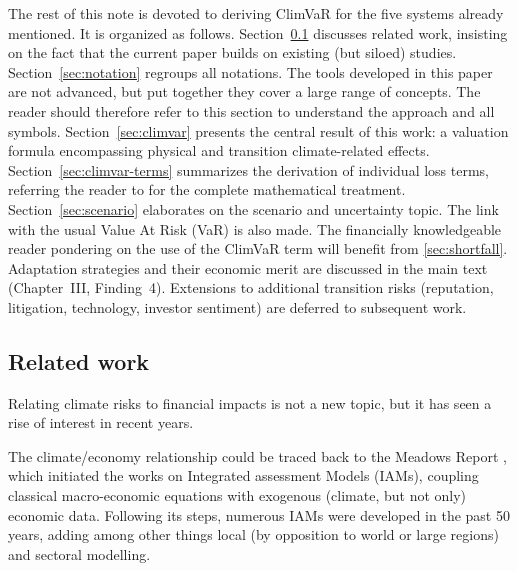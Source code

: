 The rest of this note is devoted to deriving ClimVaR for the five systems already mentioned.  It is organized as follows. Section~\ref{sec:related} discusses related work, insisting on the fact that the current paper builds on existing (but siloed) studies. Section~\ref{sec:notation} regroups all notations. The tools developed in this paper are not advanced, but put together they cover a large range of concepts. The reader should therefore refer to this section to understand the approach and all symbols. Section~\ref{sec:climvar} presents the central result of this work: a valuation formula encompassing physical and transition climate-related effects. Section~\ref{sec:climvar-terms} summarizes the derivation of individual loss terms, referring the reader to \citet{epelbaum2025} for the complete mathematical treatment. Section~\ref{sec:scenario} elaborates on the scenario and uncertainty topic. The link with the usual Value At Risk (VaR) is also made. The financially knowledgeable reader pondering on the use of the ClimVaR term will benefit from \ref{sec:shortfall}. Adaptation strategies and their economic merit are discussed in the main text (Chapter~III, Finding~4). Extensions to additional transition risks (reputation, litigation, technology, investor sentiment) are deferred to subsequent work.


\subsection{Related work} \label{sec:related}

Relating climate risks to financial impacts is not a new topic, but it has seen a rise of interest in recent years.

\vspace{0.2cm}

The climate/economy relationship could be traced back to the Meadows Report \cite{Meadows1972}, which initiated the works on Integrated assessment Models (IAMs), coupling classical macro-economic equations with exogenous (climate, but not only) economic data. Following its steps, numerous IAMs \cite{DICE}\cite{GLOBIOM}\cite{Remind}\cite{MESSAGE} were developed in the past 50 years, adding among other things local (by opposition to world or large regions) and sectoral modelling.

\vspace{0.2cm}

